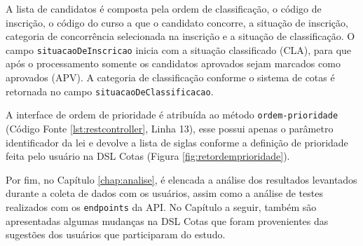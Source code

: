 A lista de candidatos é composta pela ordem de classificação, o código de inscrição, o código do curso a que o candidato concorre, a situação de inscrição, categoria de concorrência selecionada na inscrição e a situação de classificação. O campo \texttt{situacaoDeInscricao} inicia com a situação classificado (CLA), para que após o processamento somente os candidatos aprovados sejam marcados como aprovados (APV). A categoria de classificação conforme o sistema de cotas é retornada no campo \texttt{situacaoDeClassificacao}.

\newpage
A interface de ordem de prioridade é atribuída ao método \texttt{ordem-prioridade} (Código Fonte \ref{lst:restcontroller}, Linha 13), esse possui apenas o parâmetro identificador da lei e devolve a lista de siglas conforme a definição de prioridade feita pelo usuário na DSL Cotas (Figura \ref{fig:retordemprioridade}).



\newpage
Por fim, no Capítulo \ref{chap:analise}, é elencada a análise dos resultados levantados durante a coleta de dados com os usuários, assim como a análise de testes realizados com os \texttt{endpoints} da API. No Capítulo a seguir, também são apresentadas algumas mudanças na DSL Cotas que foram provenientes das sugestões dos usuários que participaram do estudo.